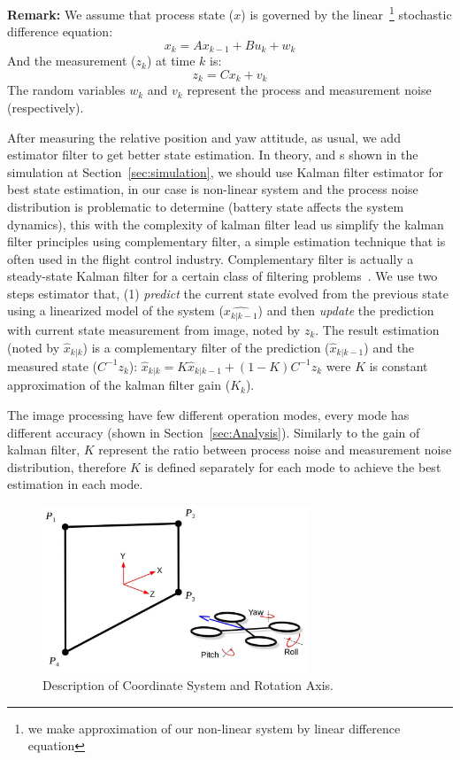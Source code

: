 \documentclass{sig-alternate-ipsn13}
\begin{document}
{\bf Remark:} We assume that process state ($x$) is governed by the linear~\footnote{we make approximation of our non-linear system by linear difference equation} stochastic difference equation:
    $$x_{k}=Ax_{k-1} + Bu_{k} + w_{k}$$
    And the measurement ($z_k$) at time $k$ is:
    $$z_k=Cx_k+v_k$$
    The random variables $w_k$ and $v_k$ represent the process and measurement noise (respectively).

After measuring the relative position and yaw attitude, as usual, we add estimator filter to get better state estimation. 
In theory, and s shown in the simulation at Section~\ref{sec:simulation}, we should use Kalman filter estimator for best state estimation, in our case is non-linear system and the process noise distribution is problematic to determine (battery state affects the system dynamics), this with the complexity of kalman filter lead us simplify the kalman filter principles using complementary filter, a simple estimation technique that is often used in the flight control industry.
Complementary filter is actually a steady-state Kalman filter for a certain class of filtering problems~\cite{complementaryVSKalman}.
We use two steps estimator that, (1) \textit{predict} the current state evolved from the previous state using a linearized model of the system ($\hat{x_{k|k-1}}$) and then \textit{update} the prediction with current state measurement from image, noted by $z_k$.
The result estimation (noted by $\hat{x}_{k|k}$) is a complementary filter of the prediction ($\hat{x}_{k|k-1}$) and the measured state ($C^{-1}z_k$):
$ \hat{x}_{k|k} = K \hat{x}_{k|k-1} + (1-K) C^{-1}z_k $ were $K$ is constant approximation of the kalman filter gain ($K_k$).

The image processing have few different operation modes, every mode has different accuracy (shown in Section~\ref{sec:Analysis}).
Similarly to the gain of kalman filter, $K$ represent the ratio between process noise and measurement noise distribution, therefore $K$ is defined separately for each mode to achieve the best estimation in each mode.

\begin{figure}[htbp]
    \centerline{\includegraphics[width=80mm]{axis.jpg}}
    \caption{Description of Coordinate System and Rotation Axis.}
    \label{fig:axis}
\end{figure}
\end{document}
